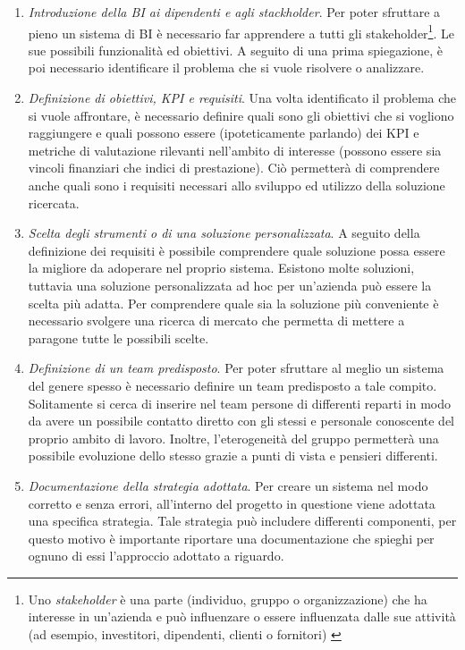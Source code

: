 \begin{enumerate}
    \item \textit{Introduzione della BI ai dipendenti e agli stackholder}. Per poter sfruttare a pieno un sistema di BI è necessario far apprendere a tutti gli stakeholder\footnote{Uno \textit{stakeholder} è una parte (individuo, gruppo o organizzazione) che ha interesse in un'azienda e può influenzare o essere influenzata dalle sue attività (ad esempio, investitori, dipendenti, clienti o fornitori) \cite{investopedia_stakeholder}}. Le sue possibili funzionalità ed obiettivi. A seguito di una prima spiegazione, è poi necessario identificare il problema che si vuole risolvere o analizzare.
    \item \textit{Definizione di obiettivi, KPI e requisiti}. Una volta identificato il problema che si vuole affrontare, è necessario definire quali sono gli obiettivi che si vogliono raggiungere e quali possono essere (ipoteticamente parlando) dei KPI e metriche di valutazione rilevanti nell'ambito di interesse (possono essere sia vincoli finanziari che indici di prestazione). Ciò permetterà di comprendere anche quali sono i requisiti necessari allo sviluppo ed utilizzo della soluzione ricercata.
    \item \textit{Scelta degli strumenti o di una soluzione personalizzata}. A seguito della definizione dei requisiti è possibile comprendere quale soluzione possa essere la migliore da adoperare nel proprio sistema. Esistono molte soluzioni, tuttavia una soluzione personalizzata ad hoc per un'azienda può essere la scelta più adatta. Per comprendere quale sia la soluzione più conveniente è necessario svolgere una ricerca di mercato che permetta di mettere a paragone tutte le possibili scelte.
    \item \textit{Definizione di un team predisposto}. Per poter sfruttare al meglio un sistema del genere spesso è necessario definire un team predisposto a tale compito. Solitamente si cerca di inserire nel team persone di differenti reparti in modo da avere un possibile contatto diretto con gli stessi e personale conoscente del proprio ambito di lavoro. Inoltre, l'eterogeneità del gruppo permetterà una possibile evoluzione dello stesso grazie a punti di vista e pensieri differenti.
    \item \textit{Documentazione della strategia adottata}. Per creare un sistema nel modo corretto e senza errori, all'interno del progetto in questione viene adottata una specifica strategia. Tale strategia può includere differenti componenti, per questo motivo è importante riportare una documentazione che spieghi per ognuno di essi l'approccio adottato a riguardo.

\end{enumerate}
